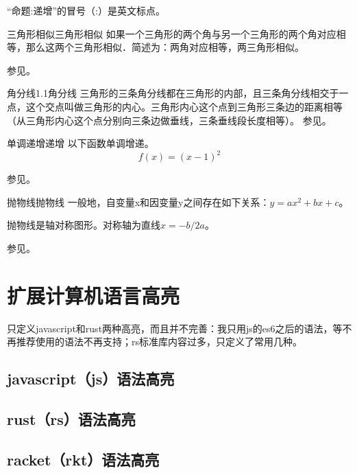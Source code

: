 \documentclass{morelull}
\begin{document}
\begin{注意}
    “命题:递增”的冒号（:）是英文标点。
\end{注意}

\begin{定理}{三角形相似}{三角形相似}
    如果一个三角形的两个角与另一个三角形的两个角对应相等，那么这两个三角形相似．简述为：两角对应相等，两三角形相似。

    参见。
\end{定理}

\begin{结论}{角分线1.1}{角分线}
    三角形的三条角分线都在三角形的内部，且三条角分线相交于一点，这个交点叫做三角形的内心。三角形内心这个点到三角形三条边的距离相等（从三角形内心这个点分别向三条边做垂线，三条垂线段长度相等）。
    参见。
\end{结论}

\begin{命题}{单调递增}{递增}
以下函数单调增递。
\[
    f(x) = (x - 1) ^ 2
\]

参见。
\end{命题}

\begin{定义}{抛物线}{抛物线}
    一般地，自变量x和因变量y之间存在如下关系：$y=ax^2+bx+c$。

    抛物线是轴对称图形。对称轴为直线$x=-b/2a$。

    参见。
\end{定义}

\section{扩展计算机语言高亮}
只定义javascript和rust两种高亮，而且并不完善：我只用js的es6之后的语法，等不再推荐使用的语法不再支持；rs标准库内容过多，只定义了常用几种。

\subsection{javascript（js）语法高亮}


\subsection{rust（rs）语法高亮}


\subsection{racket（rkt）语法高亮}

\end{document}
